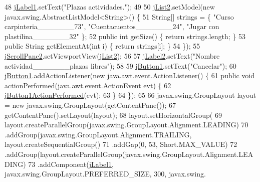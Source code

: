 \begin{DoxyCode}
48         \mbox{\hyperlink{classinterfacessoguar_1_1verplazas_c_u04_afdbe2344e261b706d86ca4f7a224cd0c}{jLabel1}}.setText(\textcolor{stringliteral}{"Plazas actividades."});
49 
50         \mbox{\hyperlink{classinterfacessoguar_1_1verplazas_c_u04_a56747d2eed236a05a0369d85176c5ca3}{jList2}}.setModel(\textcolor{keyword}{new} javax.swing.AbstractListModel<String>() \{
51             String[] strings = \{ \textcolor{stringliteral}{"Curso carpinteria\_\_\_\_\_\_\_73"}, \textcolor{stringliteral}{"Cuentacuentos\_\_\_\_\_\_\_24"}, \textcolor{stringliteral}{"Jugar con
       plastilina\_\_\_\_\_\_\_32"} \};
52             \textcolor{keyword}{public} \textcolor{keywordtype}{int} getSize() \{ \textcolor{keywordflow}{return} strings.length; \}
53             \textcolor{keyword}{public} String getElementAt(\textcolor{keywordtype}{int} i) \{ \textcolor{keywordflow}{return} strings[i]; \}
54         \});
55         \mbox{\hyperlink{classinterfacessoguar_1_1verplazas_c_u04_a2c437bac63275cca364bd05ee48332e6}{jScrollPane2}}.setViewportView(\mbox{\hyperlink{classinterfacessoguar_1_1verplazas_c_u04_a56747d2eed236a05a0369d85176c5ca3}{jList2}});
56 
57         \mbox{\hyperlink{classinterfacessoguar_1_1verplazas_c_u04_a27d9e05008cd65fbf1961ab5fbff22b0}{jLabel2}}.setText(\textcolor{stringliteral}{"Nombre actividad\_\_\_\_\_\_\_plazas libres"});
58 
59         \mbox{\hyperlink{classinterfacessoguar_1_1verplazas_c_u04_a2711671a6e6008061f70195e1689943e}{jButton1}}.setText(\textcolor{stringliteral}{"Cancelar"});
60         \mbox{\hyperlink{classinterfacessoguar_1_1verplazas_c_u04_a2711671a6e6008061f70195e1689943e}{jButton1}}.addActionListener(\textcolor{keyword}{new} java.awt.event.ActionListener() \{
61             \textcolor{keyword}{public} \textcolor{keywordtype}{void} actionPerformed(java.awt.event.ActionEvent evt) \{
62                 \mbox{\hyperlink{classinterfacessoguar_1_1verplazas_c_u04_a7547091247028b25efb81115983cc7f2}{jButton1ActionPerformed}}(evt);
63             \}
64         \});
65 
66         javax.swing.GroupLayout layout = \textcolor{keyword}{new} javax.swing.GroupLayout(getContentPane());
67         getContentPane().setLayout(layout);
68         layout.setHorizontalGroup(
69             layout.createParallelGroup(javax.swing.GroupLayout.Alignment.LEADING)
70             .addGroup(javax.swing.GroupLayout.Alignment.TRAILING, layout.createSequentialGroup()
71                 .addGap(0, 53, Short.MAX\_VALUE)
72                 .addGroup(layout.createParallelGroup(javax.swing.GroupLayout.Alignment.LEADING)
73                     .addComponent(\mbox{\hyperlink{classinterfacessoguar_1_1verplazas_c_u04_afdbe2344e261b706d86ca4f7a224cd0c}{jLabel1}}, javax.swing.GroupLayout.PREFERRED\_SIZE, 300, javax.swing.

\end{DoxyCode}
